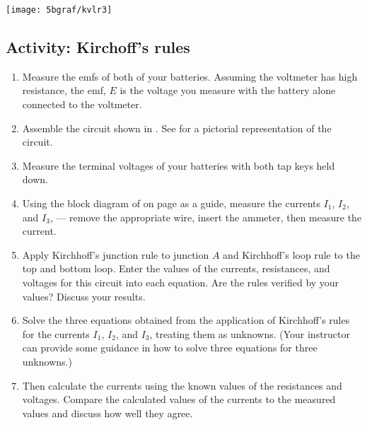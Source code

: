 \begin{multicols}{2}
\begin{center}
	\texttt{[image: 5bgraf/kvlr3]}	 %
	\label{f:kvlr3}
\end{center}

\subsection{Activity: Kirchoff's rules}
\begin{enumerate}
	 \item Measure the emfs of both of your batteries.  Assuming the voltmeter has high resistance, the emf, $E$ is the voltage you measure with the battery alone connected to the voltmeter.
	\item Assemble the circuit shown in .
	See  for a pictorial representation of the circuit.
	\item Measure the terminal voltages of your batteries with both tap keys held down.
	\item Using the block diagram of  on page \pageref{f:fig10b} as a guide, measure the currents $I_1$, $I_2$, and $I_3$, --- remove the appropriate wire, insert the ammeter, then measure the current.
	\item Apply Kirchhoff's junction rule to junction $A$ and Kirchhoff's loop rule to the top and bottom loop.  Enter the values of the currents, resistances, and voltages for this circuit into each equation.  Are the rules verified by your values? Discuss your results.
	\item Solve the three equations obtained from the application of Kirchhoff's rules for the currents $I_1$, $I_2$, and $I_3$, treating them as unknowns. (Your instructor can provide some guidance in how to solve three equations for three unknowns.)
	\item Then calculate the currents using the known values of the resistances and voltages.  Compare the calculated values of the currents to the measured values and discuss how well they agree. 
\end{enumerate}

%
\end{multicols}

